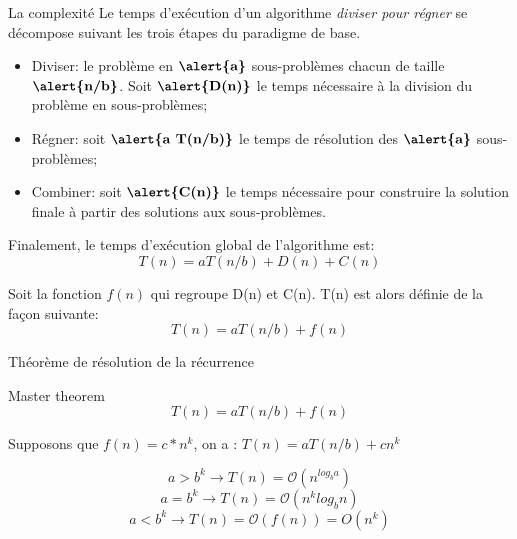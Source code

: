 \documentclass[10pt,xcolor=dvipsnames]{beamer}
\begin{document}
\begin{frame}{La complexité}
Le temps d'exécution d'un algorithme \textit{diviser pour régner} se décompose suivant les trois étapes du paradigme de base.


\begin{itemize}
    \item \alert{Diviser}: le problème en $\textbf{\alert{a}}$ sous-problèmes chacun de taille $\textbf{\alert{n/b}}$. Soit $\textbf{\alert{D(n)}}$ le temps nécessaire à la division du problème en sous-problèmes;
    \item \alert{Régner}: soit $\textbf{\alert{a T(n/b)}}$ le temps de résolution des $\textbf{\alert{a}}$ sous-problèmes;
    \item \alert{Combiner}: soit $\textbf{\alert{C(n)}}$ le temps nécessaire pour construire la solution finale à partir des solutions aux sous-problèmes.
\end{itemize}
    
Finalement, le temps d'exécution global de l'algorithme est:
\begin{equation*}
    T(n) = a T(n/b) + D(n) + C(n)
\end{equation*}

Soit la fonction $f(n)$ qui regroupe D(n) et C(n). T(n) est alors définie de la façon suivante:
\begin{equation*}
    T(n) = a T(n/b) + f(n)
\end{equation*}
\end{frame}

\begin{frame}{Théorème de résolution de la récurrence}
\begin{exampleblock}{Master theorem}
\begin{equation*}
    T(n) = a T(n/b) + f(n)
\end{equation*}
\end{exampleblock}


Supposons que $f(n) = c*n^k$, on a : $T(n) = a T(n/b) + c n^k$

\begin{equation*}
    a > b^k \rightarrow T(n) = \mathcal{O}(n^{log_b a})
\end{equation*}
\begin{equation*}
    a = b^k \rightarrow T(n) = \mathcal{O}(n^k log_b n)
\end{equation*}
\begin{equation*}
    a < b^k \rightarrow T(n) = \mathcal{O}( f(n) ) = O(n^k)
\end{equation*}
\end{frame}
\end{document}
